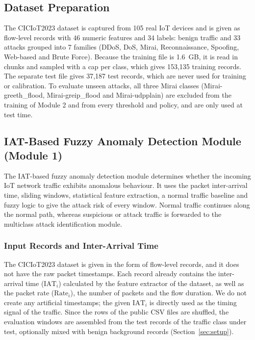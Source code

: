 \documentclass[]{interact}
\theoremstyle{plain}%
\theoremstyle{definition}
\theoremstyle{remark}
\begin{document}
\subsection{Dataset Preparation}
The CICIoT2023 dataset is captured from 105 real IoT devices and is given as flow-level records with 46 numeric features and 34 labels: benign traffic and 33 attacks grouped into 7 families (DDoS, DoS, Mirai, Reconnaissance, Spoofing, Web-based and Brute Force). Because the training file is 1.6~GB, it is read in chunks and sampled with a cap per class, which gives 153,135 training records. The separate test file gives 37,187 test records, which are never used for training or calibration. To evaluate unseen attacks, all three Mirai classes (Mirai-greeth\_flood, Mirai-greip\_flood and Mirai-udpplain) are excluded from the training of Module 2 and from every threshold and policy, and are only used at test time.


\subsection{IAT-Based Fuzzy Anomaly Detection Module (Module 1)}
The IAT-based fuzzy anomaly detection module determines whether the incoming IoT network traffic exhibits anomalous behaviour. It uses the packet inter-arrival time, sliding windows, statistical feature extraction, a normal traffic baseline and fuzzy logic to give the attack risk of every window. Normal traffic continues along the normal path, whereas suspicious or attack traffic is forwarded to the multiclass attack identification module.

\subsubsection{Input Records and Inter-Arrival Time}
The CICIoT2023 dataset is given in the form of flow-level records, and it does not have the raw packet timestamps. Each record already contains the inter-arrival time ($\mathrm{IAT}_i$) calculated by the feature extractor of the dataset, as well as the packet rate ($\mathrm{Rate}_i$), the number of packets and the flow duration. We do not create any artificial timestamps; the given $\mathrm{IAT}_i$ is directly used as the timing signal of the traffic. Since the rows of the public CSV files are shuffled, the evaluation windows are assembled from the test records of the traffic class under test, optionally mixed with benign background records (Section~\ref{sec:setup}).
\end{document}

